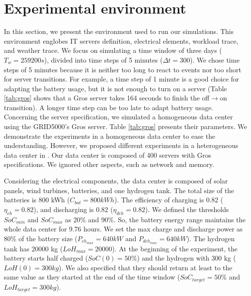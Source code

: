 \section{Experimental environment}
\label{sec:experiment_environment}

In this section, we present the environment used to run our simulations. This environment englobes IT servers definition, electrical elements, workload trace, and weather trace. We focus on simulating a time window of three days ($T_{w}=259200 s$), divided into time steps of 5 minutes ($\Delta t=300$). We chose time steps of 5 minutes because it is neither too long to react to events nor too short for server transitions. For example, a time step of 1 minute is a good choice for adapting the battery usage, but it is not enough to turn on a server (Table \ref{tab:gros} shows that a Gros server takes 164 seconds to finish the off$\rightarrow$on transition). A longer time step can be too late to adapt battery usage. Concerning the server specification, we simulated a homogeneous data center using the GRID5000's Gros server. Table \ref{tab:gros} presents their parameters. We demonstrate the experiments in a homogeneous data center to ease the understanding. However, we proposed different experiments in a heterogeneous data center in \cite{de2022analyzing}. Our data center is composed of 400 servers with Gros specifications. We ignored other aspects, such as network and memory. 

Considering the electrical components, the data center is composed of solar panels, wind turbines, batteries, and one hydrogen tank. The total size of the batteries is 800 kWh ($C_{bat}=800kWh$). The efficiency of charging is 0.82 ($\eta_{ch}=0.82$), and discharging is 0.82 ($\eta_{dch}=0.82$). We defined the thresholds $SoC_{min}$ and $SoC_{max}$ as 20\% and 90\%. So, the battery energy range maintains the whole data center for 9.76 hours. We set the max charge and discharge power as 80\% of the battery size ($P_{ch_{max}}=640kW$ and $P_{dch_{max}}=640kW$). The hydrogen tank has 20000 kg ($LoH_{max}=20000$).
At the beginning of the experiment, the battery starts half charged ($SoC(0)=50\%$) and the hydrogen with 300 kg ($LoH(0)=300kg$). We also specified that they should return at least to the same value as they started at the end of the time window ($SoC_{target} = 50\%$ and $LoH_{target}=300kg$).

